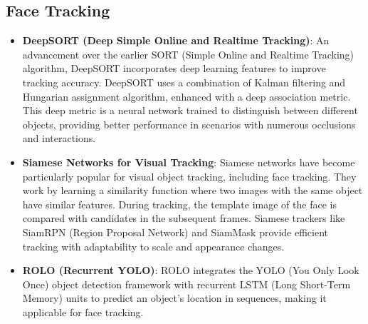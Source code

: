 	\subsection{Face Tracking}
		\begin{itemize}
			\item \textbf{DeepSORT (Deep Simple Online and Realtime Tracking)}: An advancement over the earlier SORT (Simple Online and Realtime Tracking) algorithm, DeepSORT incorporates deep learning features to improve tracking accuracy. DeepSORT uses a combination of Kalman filtering and Hungarian assignment algorithm, enhanced with a deep association metric. This deep metric is a neural network trained to distinguish between different objects, providing better performance in scenarios with numerous occlusions and interactions.
			\item \textbf{Siamese Networks for Visual Tracking}: Siamese networks have become particularly popular for visual object tracking, including face tracking. They work by learning a similarity function where two images with the same object have similar features. During tracking, the template image of the face is compared with candidates in the subsequent frames. Siamese trackers like SiamRPN (Region Proposal Network) and SiamMask provide efficient tracking with adaptability to scale and appearance changes.			
			\item \textbf{ROLO (Recurrent YOLO)}: ROLO integrates the YOLO (You Only Look Once) object detection framework with recurrent LSTM (Long Short-Term Memory) units to predict an object's location in sequences, making it applicable for face tracking.
		\end{itemize}
	
